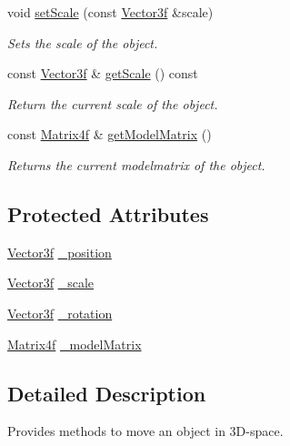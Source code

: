 \begin{DoxyCompactItemize}
void \hyperlink{classburn_1_1_transformable_a7e73a5706524923d4fc6c13990b7f575}{set\-Scale} (const \hyperlink{namespaceburn_a9d6d349c94bc4dc9699427216128a0ef}{Vector3f} \&scale)
\begin{DoxyCompactList}\small\item\em Sets the scale of the object. \end{DoxyCompactList}\item 
const \hyperlink{namespaceburn_a9d6d349c94bc4dc9699427216128a0ef}{Vector3f} \& \hyperlink{classburn_1_1_transformable_a7e6d9642bcb49deb83b38a3831824b52}{get\-Scale} () const 
\begin{DoxyCompactList}\small\item\em Return the current scale of the object. \end{DoxyCompactList}\item 
const \hyperlink{namespaceburn_a643e9d2ffceb4304e3755a100268a7a3}{Matrix4f} \& \hyperlink{classburn_1_1_transformable_a8743b842184630917ee67e8e8039fc6f}{get\-Model\-Matrix} ()
\begin{DoxyCompactList}\small\item\em Returns the current modelmatrix of the object. \end{DoxyCompactList}\end{DoxyCompactItemize}
\subsection*{Protected Attributes}
\begin{DoxyCompactItemize}
\item 
\hyperlink{namespaceburn_a9d6d349c94bc4dc9699427216128a0ef}{Vector3f} \hyperlink{classburn_1_1_transformable_a1cb1a52f8518c7c2f50e45d8cd902767}{\-\_\-position}
\item 
\hyperlink{namespaceburn_a9d6d349c94bc4dc9699427216128a0ef}{Vector3f} \hyperlink{classburn_1_1_transformable_a80e5ca4d02b2d58593b751b040e86492}{\-\_\-scale}
\item 
\hyperlink{namespaceburn_a9d6d349c94bc4dc9699427216128a0ef}{Vector3f} \hyperlink{classburn_1_1_transformable_ad62e417f44d78cbeedfd30e62c1b896d}{\-\_\-rotation}
\item 
\hyperlink{namespaceburn_a643e9d2ffceb4304e3755a100268a7a3}{Matrix4f} \hyperlink{classburn_1_1_transformable_a6a06bcec86a7f2e70eba6fe7e8bbe61c}{\-\_\-model\-Matrix}
\end{DoxyCompactItemize}


\subsection{Detailed Description}
Provides methods to move an object in 3\-D-\/space. 

